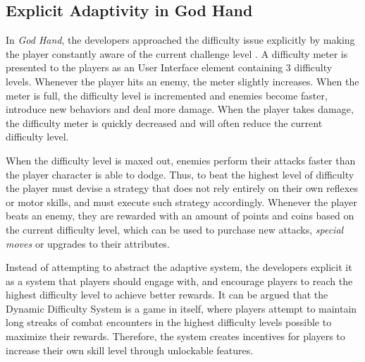 \subsection{Explicit Adaptivity in God Hand}


In \emph{God Hand}, the developers approached the difficulty issue explicitly by making the player constantly aware of the current challenge level \cite{article_subjectivedifficulty}. A difficulty meter is presented to the players as an User Interface element containing 3 difficulty levels. Whenever the player hits an enemy, the meter slightly increases. When the meter is full, the difficulty level is incremented and enemies become faster, introduce new behaviors and deal more damage. When the player takes damage, the difficulty meter is quickly decreased and will often reduce the current difficulty level.

When the difficulty level is maxed out, enemies perform their attacks faster than the player character is able to dodge. Thus, to beat the highest level of difficulty the player must devise a strategy that does not rely entirely on their own reflexes or motor skills, and must execute such strategy accordingly. Whenever the player beats an enemy, they are rewarded with an amount of points and coins based on the current difficulty level, which can be used to purchase new attacks, \emph{special moves} or upgrades to their attributes.



Instead of attempting to abstract the adaptive system, the developers explicit it as a system that players should engage with, and encourage players to reach the highest difficulty level to achieve better rewards. It can be argued that the Dynamic Difficulty System is a game in itself, where players attempt to maintain long streaks of combat encounters in the highest difficulty levels possible to maximize their rewards. Therefore, the system creates incentives for players to increase their own skill level through unlockable features.

